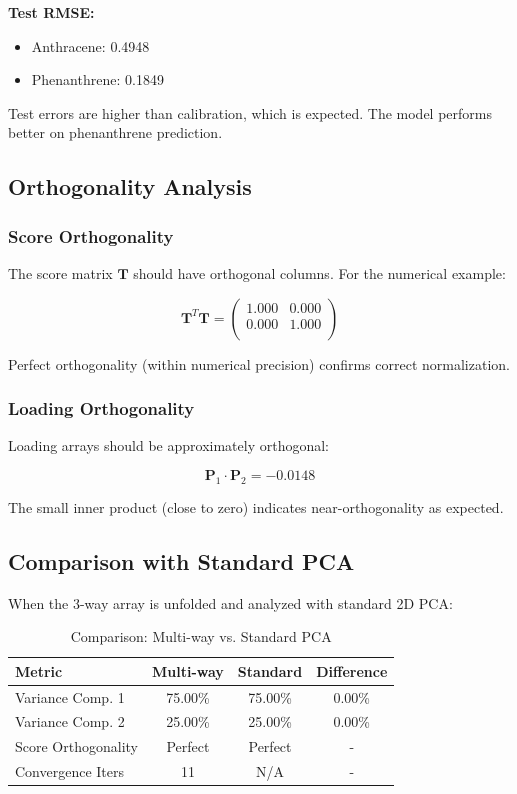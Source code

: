 \documentclass[12pt,a4paper]{article}
\begin{document}
\textbf{Test RMSE:}
\begin{itemize}
    \item Anthracene: 0.4948
    \item Phenanthrene: 0.1849
\end{itemize}

Test errors are higher than calibration, which is expected. The model performs better on phenanthrene prediction.

\subsection{Orthogonality Analysis}

\subsubsection{Score Orthogonality}

The score matrix $\mathbf{T}$ should have orthogonal columns. For the numerical example:

$$\mathbf{T}^T \mathbf{T} = \begin{pmatrix}
1.000 & 0.000 \\
0.000 & 1.000 \\
\end{pmatrix}$$

Perfect orthogonality (within numerical precision) confirms correct normalization.

\subsubsection{Loading Orthogonality}

Loading arrays should be approximately orthogonal:

$$\mathbf{P}_1 \cdot \mathbf{P}_2 = -0.0148$$

The small inner product (close to zero) indicates near-orthogonality as expected.

\subsection{Comparison with Standard PCA}

When the 3-way array is unfolded and analyzed with standard 2D PCA:

\begin{table}[H]
\centering
\caption{Comparison: Multi-way vs. Standard PCA}
\begin{tabular}{lccc}
\toprule
\textbf{Metric} & \textbf{Multi-way} & \textbf{Standard} & \textbf{Difference} \\
\midrule
Variance Comp. 1 & 75.00\% & 75.00\% & 0.00\% \\
Variance Comp. 2 & 25.00\% & 25.00\% & 0.00\% \\
Score Orthogonality & Perfect & Perfect & - \\
Convergence Iters & 11 & N/A & - \\
\bottomrule
\end{tabular}
\end{table}
\end{document}

